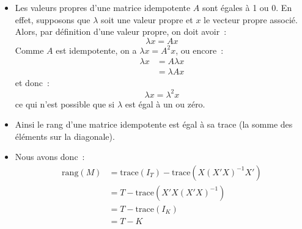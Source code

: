 \documentclass[10pt,a4paper]{article}
\theoremstyle{definition}
\renewcommand{\newline}{\unskip\par\vspace{1.5pt}}
\begin{document}
\begin{notes}

  \begin{itemize}

  \item Les valeurs propres d'une matrice idempotente $A$ sont égales à 1 ou 0. En effet, supposons que $\lambda$ soit une valeur propre et $x$ le vecteur propre associé. Alors, par définition d'une valeur propre, on doit avoir~:
    \[
      \lambda x = A x
    \]
    Comme $A$ est idempotente, on a $\lambda x = A^2 x$, ou encore~:
    \[
      \begin{split}
        \lambda x &= A \lambda x\\
        &= \lambda A x
      \end{split}
    \]
    et donc~:
    \[
      \lambda x = \lambda^2 x
    \]
    ce qui n'est possible que si $\lambda$ est égal à un ou zéro.\newline

  \item Ainsi le rang d'une matrice idempotente est égal à sa trace (la somme des éléments sur la diagonale).\newline

  \item Nous avons donc~:
    \[
      \begin{split}
        \mathrm{rang}(M) &= \mathrm{trace}(I_T) - \mathrm{trace}\left( X(X'X)^{-1}X' \right)\\
                         &= T - \mathrm{trace}\left( X'X(X'X)^{-1} \right)\\
                         &= T - \mathrm{trace}\left(I_K\right)\\
        &= T-K
      \end{split}
  \]
  \end{itemize}

\end{notes}
\end{document}
